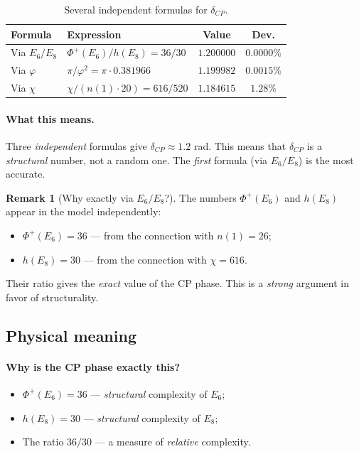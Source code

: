 \documentclass[11pt,a4paper]{article}
\theoremstyle{definition}
\newtheorem{remark}[theorem]{Remark}
\begin{document}
\begin{table}[htbp]
\centering
\caption{Several independent formulas for $\delta_{CP}$.}
\label{tab:cp-alternatives}
\begin{tabular}{llcc}
\toprule
Formula & Expression & Value & Dev. \\ 
\midrule
Via $E_6/E_8$ & $\Phi^+(E_6)/h(E_8) = 36/30$ & $1.200000$ 
    & $\mathbf{0.0000\%}$ \\[0.3em]
Via $\varphi$ & $\pi/\varphi^2 = \pi \cdot 0.381966$ & $1.199982$ 
    & $0.0015\%$ \\[0.3em]
Via $\chi$ & $\chi/(n(1)\cdot 20) = 616/520$ & $1.184615$ 
    & $1.28\%$ \\[0.3em]
\bottomrule
\end{tabular}
\end{table}

\paragraph{What this means.}
Three \emph{independent} formulas give $\delta_{CP} \approx 1.2$ rad. 
This means that $\delta_{CP}$ is a \emph{structural} number, 
not a random one. The \emph{first} formula (via $E_6/E_8$) is 
the most accurate.

\begin{remark}[Why exactly via $E_6/E_8$?]
\label{rem:why-e6-e8}
The numbers $\Phi^+(E_6)$ and $h(E_8)$ appear in the model independently:
\begin{itemize}
    \item $\Phi^+(E_6) = 36$ — from the connection with $n(1) = 26$;
    \item $h(E_8) = 30$ — from the connection with $\chi = 616$.
\end{itemize}
Their ratio gives the \emph{exact} value of the CP phase. 
This is a \emph{strong} argument in favor of structurality.
\end{remark}

\subsection{Physical meaning}
\label{subsec:cp-meaning}

\paragraph{Why is the CP phase exactly this?}
\begin{itemize}
    \item $\Phi^+(E_6) = 36$ — \emph{structural} complexity of $E_6$;
    \item $h(E_8) = 30$ — \emph{structural} complexity of $E_8$;
    \item The ratio $36/30$ — a measure of \emph{relative} complexity.
\end{itemize}
\end{document}
